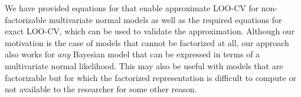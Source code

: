 \documentclass[11pt]{article}
\begin{document}
We have provided equations for that enable approximate 
LOO-CV for non-factorizable multivariate normal models as well as the required
equations for exact LOO-CV, which can be used to validate the approximation. 
Although our motivation is the case of models that cannot be factorized at all, 
our approach also works for \emph{any} Bayesian model that can be expressed in
terms of a multivariate normal likelihood. This may also be useful with
models that are factorizable but for which the factorized representation is
difficult to compute or not available to the researcher for some other reason.






\end{document}

